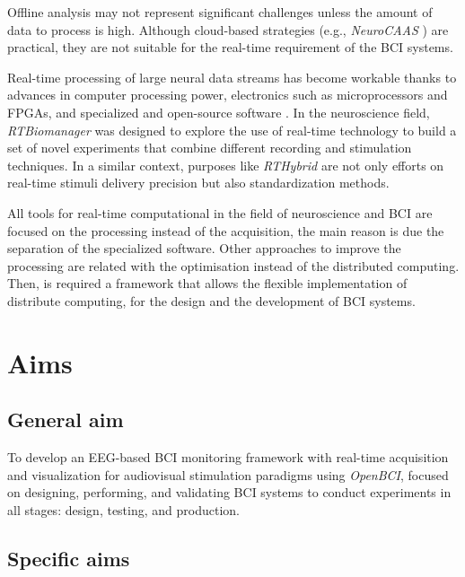 Offline analysis may not represent significant challenges unless the amount of data to process is high. Although cloud-based strategies (e.g., \textit{NeuroCAAS} \cite{abe2021neuroscience}) are practical, they are not suitable for the real-time requirement of the \gls*{BCI} systems.

Real-time processing of large neural data streams has become workable thanks to advances in computer processing power, electronics such as microprocessors and \glspl*{FPGA}, and specialized and open-source software \cite{potter2014closed}. In the neuroscience field, \textit{RTBiomanager} \cite{muniz2009rtbiomanager} was designed to explore the use of real-time technology to build a set of novel experiments that combine different recording and stimulation techniques. In a similar context, purposes like \textit{RTHybrid} \cite{amaducci2019rthybrid} are not only efforts on real-time stimuli delivery precision but also standardization methods.

{\color{Nessa}
All tools for real-time computational in the field of neuroscience and \gls*{BCI} are focused on the processing instead of the acquisition, the main reason is due the separation of the specialized software. Other approaches to improve the processing are related with the optimisation instead of the distributed computing. Then, is required a framework that allows the flexible implementation of distribute computing, for the design and the development of \gls*{BCI} systems.}


\section{Aims}\label{sec:objectives}

\subsection{General aim}

To develop an \gls*{EEG}-based \gls*{BCI} monitoring framework with real-time acquisition and visualization for audiovisual stimulation paradigms using \textit{OpenBCI}, focused on designing, performing, and validating \gls*{BCI} systems to conduct experiments in all stages: design, testing, and production.

\subsection{Specific aims}

